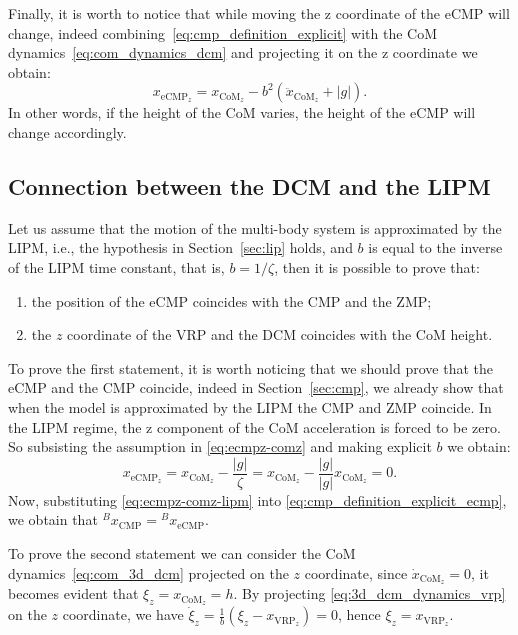 Finally, it is worth to notice that while moving the z coordinate of the eCMP will change, indeed combining~\eqref{eq:cmp_definition_explicit} with the CoM dynamics~\eqref{eq:com_dynamics_dcm} and projecting it on the z coordinate we obtain:
\begin{equation}
    \label{eq:ecmpz-comz}
    x_{\text{eCMP}_z} = x_{\text{CoM}_z} - b^2 \left(\ddot{x}_{\text{CoM}_z} + |g| \right).
\end{equation}
In other words, if the height of the CoM varies, the height of the eCMP will change accordingly. 
\subsection{Connection between the DCM and the LIPM \label{sec:2D-DCM}}
Let us assume that the motion of the multi-body system is approximated by the LIPM, i.e., the hypothesis in Section~\ref{sec:lip} holds, and $b$ is equal to the inverse of the LIPM time constant, that is, $b = 1/\zeta$, then it is possible to prove that:
\begin{enumerate}
    \item the position of the eCMP coincides with the CMP and the ZMP;
    \item the $z$ coordinate of the VRP and the DCM coincides with the CoM height.
\end{enumerate}
To prove the first statement, it is worth noticing that we should prove that the eCMP and the CMP coincide, indeed in Section~\ref{sec:cmp}, we already show that when the model is approximated by the LIPM the CMP and ZMP coincide. In the LIPM regime, the z component of the CoM acceleration is forced to be zero. So subsisting the assumption in \eqref{eq:ecmpz-comz} and making explicit $b$ we obtain:
\begin{equation}
    \label{eq:ecmpz-comz-lipm}
    x_{\text{eCMP}_z} = x_{\text{CoM}_z} - \frac{|g|}{\zeta} =  x_{\text{CoM}_z} - \frac{|g|}{|g|} x_{\text{CoM}_z} = 0.
\end{equation}
Now, substituting \eqref{eq:ecmpz-comz-lipm} into \eqref{eq:cmp_definition_explicit_ecmp}, we obtain that ${}^B x_{\text{CMP}} = {}^B x_{\text{eCMP}}$.
\par
To prove the second statement we can consider the CoM dynamics~\eqref{eq:com_3d_dcm} projected on the $z$ coordinate, since $\dot{x}_{\text{CoM}_z} = 0$, it becomes evident that $\xi_z = x_{\text{CoM}_z} = h$. By projecting \eqref{eq:3d_dcm_dynamics_vrp} on the $z$ coordinate, we have $\dot{\xi}_z = \frac{1}{b}(\xi_z - x_{\text{VRP}_z}) = 0$, hence $\xi_z = x_{\text{VRP}_z}$.

